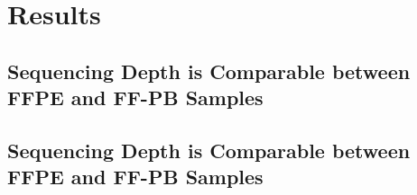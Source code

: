 
\chapter{Results}
\label{ch:Results}

\section{}
\label{sec:AssessmentofDNAQuantityandQualitybetweenSpecimenTypes}



\section{Sequencing Depth is Comparable between FFPE and FF-PB Samples}
\label{sec:SequencingDepthisComparablebetweenFFPEandFF-PBSamples}


\section{Sequencing Depth is Comparable between FFPE and FF-PB Samples}
\label{sec:SequencingDepthisComparablebetweenFFPEandFF-PBSamples}
